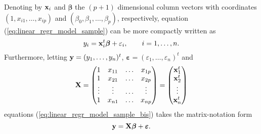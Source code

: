 Denoting by $\mathbf x_i$ and $\boldsymbol\beta$ the $(p+1)$ dimensional
column vectors with coordinates $(1, x_{i1}, \dots, x_{ip})$ and $(\beta_0,
\beta_1, \dots, \beta_p)$, respectively, equation
(\ref{eq:linear_regr_model_sample}) can be more compactly written as
%
\begin{equation}
    \label{eq:linear_regr_model_sample_bis}
    y_i = \mathbf x_i^t\boldsymbol\beta + \varepsilon_i,
    \qquad i = 1, \dots, n.
\end{equation}
%
Furthermore, letting $\mathbf y = (y_1, \dots, y_n)^t$,
$\boldsymbol\varepsilon = (\varepsilon_1, \dots, \varepsilon_n)^t$ and
\[
    \mathbf X = 
    \begin{pmatrix}
        1       & x_{11} & \dots & x_{1p} \\
        1       & x_{21} & \dots & x_{2p} \\
        \vdots  & \vdots & \dots & \vdots \\
        1       & x_{n1} & \dots & x_{np}
    \end{pmatrix}
    = 
    \begin{pmatrix}
        \mathbf x_1^t \\
        \mathbf x_2^t \\
        \vdots         \\
        \mathbf x_n^t
    \end{pmatrix}
\]
equations (\ref{eq:linear_regr_model_sample_bis}) takes the matrix-notation form
\[
    \mathbf y = \mathbf X\boldsymbol\beta + \boldsymbol\varepsilon.
\]

